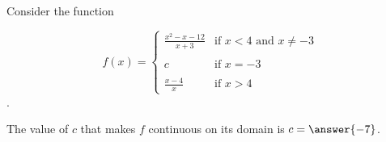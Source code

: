 \documentclass{ximera}
\author{Nela Lakos \and Kyle Parsons}
\begin{document}
\begin{exercise}

Consider the function

\[
f(x) = 
\begin{cases}
\frac{x^2-x-12}{x+3} & \text{if }x<4\text{ and }x\neq-3\\ \\
c & \text{if }x=-3\\ \\
\frac{x-4}{x} & \text{if }x>4
\end{cases}
\].

The value of $c$ that makes $f$ continuous on its domain is $c=\answer{-7}$.

\end{exercise}
\end{document}
